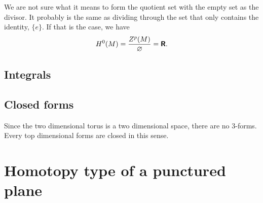 \documentclass[11pt, english, fleqn, DIV=15, headinclude, BCOR=1cm]{scrartcl}
\begin{document}
We are not sure what it means to form the quotient set with the empty set as
the divisor. It probably is the same as dividing through the set that only
contains the identity, $\{ e \}$. If that is the case, we have
\[
    H^0(M) = \frac{Z^p(M)}{\varnothing} = \text{\bfseries\sffamily R}.
\]

\subsection{Integrals}

\subsection{Closed forms}

Since the two dimensional torus is a two dimensional space, there are no
3-forms. Every top dimensional forms are closed in this sense.

\section{Homotopy type of a punctured plane}
\label{homework:3}
\end{document}
